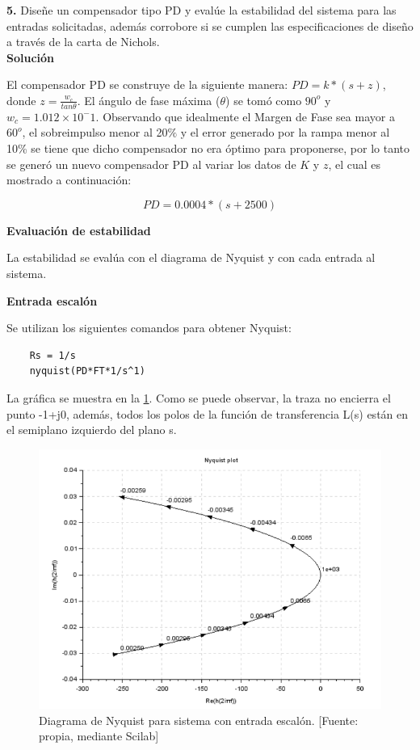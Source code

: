 \documentclass[12pt,letterpaper]{article}
\begin{document}
\bigskip


\textbf{5.} Diseñe un compensador tipo PD y evalúe la estabilidad del sistema para las entradas solicitadas, además corrobore si se cumplen las especificaciones de diseño a través de la carta de Nichols.\\

\textbf{Solución}

\bigskip

El compensador PD se construye de la siguiente manera: $PD = k*(s+z)$, donde $z = \frac{w_{c}}{tan \theta}$. El ángulo de fase máxima ($\theta$) se tomó como $90^{o}$ y $w_{c} = 1.012\times10^-1$. Observando que idealmente el Margen de Fase sea mayor a $60^{o}$, el sobreimpulso menor al 20$\%$ y el error generado por la rampa menor al 10\% se tiene que dicho compensador no era óptimo para proponerse, por lo tanto se generó un nuevo compensador PD al variar los datos de $K$ y $z$, el cual es mostrado a continuación:

\begin{equation}
    PD = 0.0004 * (s+2500)
\end{equation}

\bigskip

\textbf{Evaluación de estabilidad}

La estabilidad se evalúa con el diagrama de Nyquist y con cada entrada al sistema.

\bigskip

\textbf{Entrada escalón}

Se utilizan los siguientes comandos para obtener Nyquist:

\begin{verbatim}
    Rs = 1/s
    nyquist(PD*FT*1/s^1)
\end{verbatim}

\bigskip

La gráfica se muestra en la \ref{fig:fig5}. Como se puede observar, la traza no encierra el punto -1+j0, además, todos los polos de la función de transferencia L(s) están en el semiplano izquierdo del plano s.

\begin{figure}[hbtp]
	\centering
	\includegraphics[width = 0.75 \columnwidth]{52escalon.png} 
	\caption[Figura3]{Diagrama de Nyquist para sistema con entrada escalón. [Fuente: propia, mediante Scilab]} 
	\label{fig:fig5} 
\end{figure}
\end{document}
